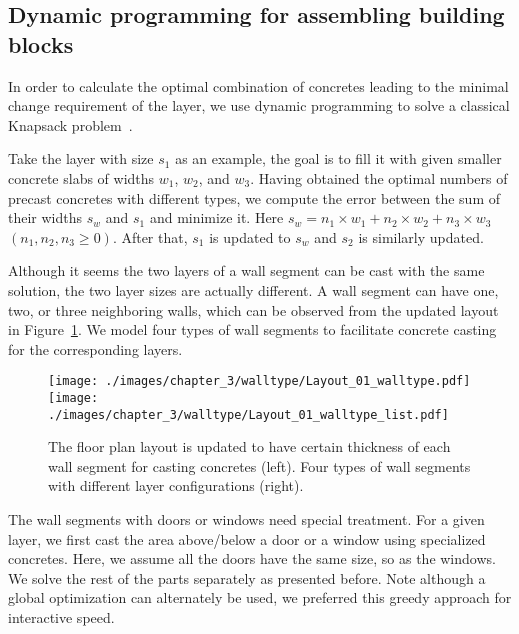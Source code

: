 \subsection{Dynamic programming for assembling building blocks}

In order to calculate the optimal combination of concretes leading to the minimal change requirement of the layer, we use dynamic programming to solve a classical Knapsack problem~\cite{gary1979computers}.

Take the layer with size $s_1$ as an example, the goal is to fill it with given smaller concrete slabs of widths $w_1$, $w_2$, and $w_3$. Having obtained the optimal numbers of precast concretes with different types, we compute the error between the sum of their widths $s_w$ and $s_1$ and minimize it. Here $s_w = n_1 \times w_1 + n_2 \times w_2 + n_3 \times w_3$ $(n_1, n_2, n_3 \geq 0)$. After that, $s_1$ is updated to $s_w$ and $s_2$ is similarly updated.

Although it seems the two layers of a wall segment can be cast with the same solution, the two layer sizes are actually different. A wall segment can have one, two, or three neighboring walls, which can be observed from the updated layout in Figure~\ref{walltype}. We model four types of wall segments to facilitate concrete casting for the corresponding layers.

\begin{figure}[h!]
\centering
\texttt{[image: ./images/chapter\_3/walltype/Layout\_01\_walltype.pdf]}
\texttt{[image: ./images/chapter\_3/walltype/Layout\_01\_walltype\_list.pdf]}
\caption[Wall types.]{The floor plan layout is updated to have certain thickness of each wall segment for casting concretes (left). Four types of wall segments with different layer configurations (right).}
\label{walltype}
\vspace{-.1in}
\end{figure}

The wall segments with doors or windows need special treatment. For a given layer, we first cast the area above/below a door or a window using specialized concretes. Here, we assume all the doors have the same size, so as the windows. We solve the rest of the parts separately as presented before. Note although a global optimization can alternately be used, we preferred this greedy approach for interactive speed.


